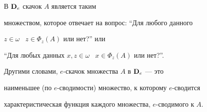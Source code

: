 В ${\bold D}_e$ скачок $A$ является таким


множеством, которое отвечает на вопрос: ``Для любого данного


$z\in\omega$ \ $z\in\Phi_z(A)$ или нет?'' или


``Для любых данных $x,z\in\omega$ \ $x\in\Phi_z(A)$ или нет?''.


Другими словами, $e$-скачок множества $A$ в ${\bold D}_e$ --- это


наименьшее (по $e$-сводимости) множество, к которому $e$-сводится


характеристическая функция каждого множества, $e$-сводимого к $A$.


